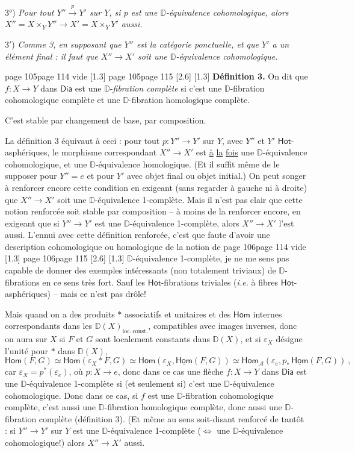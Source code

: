 \documentclass[11pt,leqno]{article}
\newcommand{\msp}[1]{%
  \begingroup\def\thismsp{#1}\def\blankmsp{page 114 vide}%
  \ifx\thismsp\blankmsp
    \marginnote{\scriptsize\sffamily [114: vide]}[1.3\baselineskip]%
  \else\def\followingmsp{page 115}%
    \ifx\thismsp\followingmsp
      \marginnote{\scriptsize\sffamily [page 115]}[2.6\baselineskip]%
    \else\marginnote{\scriptsize\sffamily [#1]}[1.3\baselineskip]\fi
  \fi\endgroup}
\newcommand{\DD}{\ensuremath{\mathbb{D}}}
\newcommand{\Dia}{\ensuremath{\mathsf{Dia}}}
\newcommand{\Hom}{\ensuremath{\mathsf{Hom}}}
\newcommand{\Hot}{\ensuremath{\mathsf{Hot}}}
\begin{document}
3°) \textit{Pour tout $Y'' \overset{p}{\to} Y'$ sur $Y$, si $p$ est une $\DD$-équivalence cohomologique, alors $X'' = X \times_Y Y'' \longrightarrow X' = X \times_Y Y'$ aussi.}

3$'$) \textit{Comme 3, en supposant que $Y''$ est la catégorie ponctuelle, et que $Y'$ a un élément final : il faut que $X'' \to X'$ soit une $\DD$-équivalence cohomologique.}

\msp{page 105}
\textbf{Définition 3.} On dit que $f : X \to Y$ dans \Dia{} est une $\DD$-\textit{fibration complète} si c’est une $\DD$-fibration cohomologique complète et une $\DD$-fibration homologique complète.

C’est stable par changement de base, par composition.

La définition 3 équivaut à ceci : pour tout $p : Y'' \to Y'$ sur $Y$, avec $Y''$ et $Y'$ \Hot-asphériques, le morphisme correspondant $X'' \to X'$ est \underline{à} \underline{la} \underline{fois} une $\DD$-équivalence cohomologique, et une $\DD$-équivalence homologique. (Et il suffit même de le supposer pour $Y'' = e$ et pour $Y'$ avec objet final ou objet initial.) On peut songer à renforcer encore cette condition en exigeant (sans regarder à gauche ni à droite) que $X'' \to X'$ soit une $\DD$-équivalence 1-complète. Mais il n’est pas clair que cette notion renforcée soit stable par composition – à moins de la renforcer encore, en exigeant que si $Y'' \to Y'$ est une $\DD$-équivalence 1-complète, alors $X'' \to X'$ l’est aussi. L’ennui avec cette définition renforcée, c’est que faute d’avoir une description cohomologique ou homologique de la notion de
\msp{page 106}
$\DD$-équivalence 1-complète, je ne me sens pas capable de donner des exemples intéressants (non totalement triviaux) de $\DD$-fibrations en ce sens très fort. Sauf les \Hot-fibrations triviales (\textit{i.e.} à fibres \Hot-asphériques) – mais ce n’est pas drôle!

Mais quand on a des produits $*$ associatifs et unitaires et des \underline{\Hom} internes correspondants dans les $\DD(X)_{\mathrm{loc.\ const.}}$, compatibles avec images inverses, donc on aura sur $X$ si $F$ et $G$ sont localement constants dans $\DD(X)$, et si $\varepsilon_X$ désigne l’unité pour $*$ dans $\DD(X)$,
\[
\Hom(F,G) \simeq \Hom(\varepsilon_X * F, G) \simeq \Hom(\varepsilon_X, \underline{\Hom}(F,G)) \simeq \Hom_{\mathcal{A}}(\varepsilon_e, p_*\, \underline{\Hom}(F,G)) \ ,
\]
car $\varepsilon_X = p^*(\varepsilon_e)$, où $p : X \to e$, donc dans ce cas une flèche $f : X \to Y$ dans \Dia{} est une $\DD$-équivalence 1-complète si (et seulement si) c’est une $\DD$-équivalence cohomologique. Donc dans ce cas, si $f$ est une $\DD$-fibration cohomologique complète, c’est aussi une $\DD$-fibration homologique complète, donc aussi une $\DD$-fibration complète (définition 3). (Et même au sens soit-disant renforcé de tantôt : si $Y'' \to Y'$ sur $Y$ est une $\DD$-équivalence 1-complète ($\Leftrightarrow$ une $\DD$-équivalence cohomologique!) alors $X'' \to X'$ aussi. %
\end{document}
